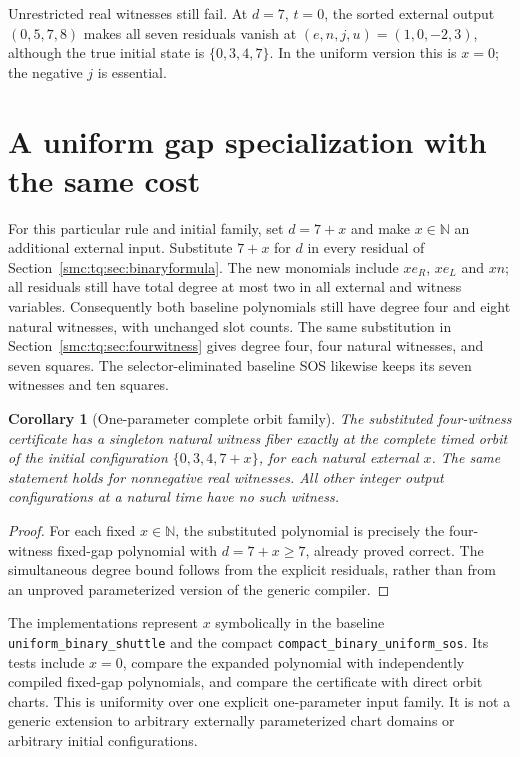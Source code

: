 \documentclass[11pt,letterpaper]{article}
\numberwithin{equation}{section}
\newtheorem{corollary}[theorem]{Corollary}
\theoremstyle{definition}
\theoremstyle{remark}
\newcommand{\NN}{\mathbb N}
\begin{document}
Unrestricted real witnesses still fail. At $d=7$, $t=0$, the sorted external
output $(0,5,7,8)$ makes all seven residuals vanish at
$(e,n,j,u)=(1,0,-2,3)$, although the true initial state is $\{0,3,4,7\}$.
In the uniform version this is $x=0$; the negative $j$ is essential.

\section{A uniform gap specialization with the same cost}\label{smc:tq:sec:uniform}
For this particular rule and initial family, set $d=7+x$ and make
$x\in\NN$ an additional external input. Substitute $7+x$ for $d$ in every
residual of Section~\ref{smc:tq:sec:binaryformula}. The new monomials include $xe_R$, $xe_L$ and $xn$;
all residuals still have total degree at most two in all external and
witness variables. Consequently both baseline polynomials still have degree four and eight
natural witnesses, with unchanged slot counts. The same substitution in
Section~\ref{smc:tq:sec:fourwitness} gives degree four, four natural witnesses,
and seven squares. The selector-eliminated baseline SOS likewise keeps its
seven witnesses and ten squares.

\begin{corollary}[One-parameter complete orbit family]\label{smc:tq:cor:uniform}
The substituted four-witness certificate has a singleton natural witness fiber exactly
at the complete timed orbit of the initial configuration
$\{0,3,4,7+x\}$, for each natural external $x$. The same statement holds for nonnegative real witnesses. All other integer
output configurations at a natural time have no such witness.
\end{corollary}
\begin{proof}
For each fixed $x\in\NN$, the substituted polynomial is precisely the
four-witness fixed-gap polynomial with $d=7+x\ge7$, already proved correct. The
simultaneous degree bound follows from the explicit residuals, rather than
from an unproved parameterized version of the generic compiler.
\end{proof}

The implementations represent $x$ symbolically in the baseline
\texttt{uniform\_binary\_shuttle} and the compact
\texttt{compact\_binary\_uniform\_sos}. Its tests include $x=0$, compare the
expanded polynomial with independently compiled fixed-gap polynomials, and
compare the certificate with direct orbit charts. This is uniformity over
one explicit one-parameter input family. It is not a generic extension to
arbitrary externally parameterized chart domains or arbitrary initial
configurations.
\end{document}
